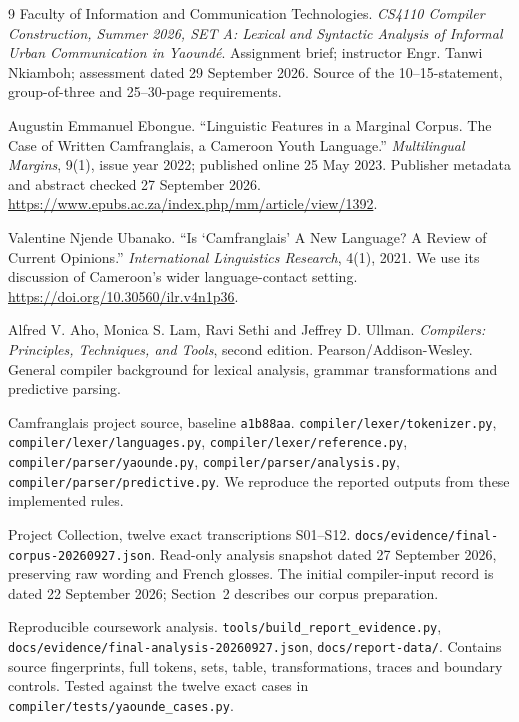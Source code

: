 \documentclass[11pt]{article}
\newcommand{\code}[1]{\texttt{#1}}
\begin{document}
\clearpage
{}
\renewcommand{\refname}{References and Evidence Register}
\begin{thebibliography}{9}
Faculty of Information and Communication Technologies.
\emph{CS4110 Compiler Construction, Summer 2026, SET A:
Lexical and Syntactic Analysis of Informal Urban Communication in Yaound\'e}.
Assignment brief; instructor Engr. Tanwi Nkiamboh; assessment dated
29 September 2026. Source of the 10--15-statement, group-of-three and
25--30-page requirements.

Augustin Emmanuel Ebongue.
``Linguistic Features in a Marginal Corpus. The Case of Written Camfranglais,
a Cameroon Youth Language.''
\emph{Multilingual Margins}, 9(1), issue year 2022; published online
25 May 2023. Publisher metadata and abstract checked 27 September 2026.
\url{https://www.epubs.ac.za/index.php/mm/article/view/1392}.

Valentine Njende Ubanako.
``Is `Camfranglais' A New Language? A Review of Current Opinions.''
\emph{International Linguistics Research}, 4(1), 2021.
We use its discussion of Cameroon's wider language-contact setting.
\url{https://doi.org/10.30560/ilr.v4n1p36}.

Alfred V. Aho, Monica S. Lam, Ravi Sethi and Jeffrey D. Ullman.
\emph{Compilers: Principles, Techniques, and Tools}, second edition.
Pearson/Addison-Wesley. General compiler background for lexical analysis,
grammar transformations and predictive parsing.

Camfranglais project source, baseline \code{a1b88aa}.
\nolinkurl{compiler/lexer/tokenizer.py},
\nolinkurl{compiler/lexer/languages.py},
\nolinkurl{compiler/lexer/reference.py},
\nolinkurl{compiler/parser/yaounde.py},
\nolinkurl{compiler/parser/analysis.py},
\nolinkurl{compiler/parser/predictive.py}.
We reproduce the reported outputs from these implemented rules.

Project Collection, twelve exact transcriptions S01--S12.
\nolinkurl{docs/evidence/final-corpus-20260927.json}.
Read-only analysis snapshot dated 27 September 2026, preserving raw wording
and French glosses. The initial compiler-input record is dated
22 September 2026; Section~2 describes our corpus preparation.

Reproducible coursework analysis.
\nolinkurl{tools/build_report_evidence.py},
\nolinkurl{docs/evidence/final-analysis-20260927.json},
\nolinkurl{docs/report-data/}.
Contains source fingerprints, full tokens, sets, table, transformations,
traces and boundary controls. Tested against the twelve exact cases in
\nolinkurl{compiler/tests/yaounde_cases.py}.


\end{thebibliography}
\end{document}
